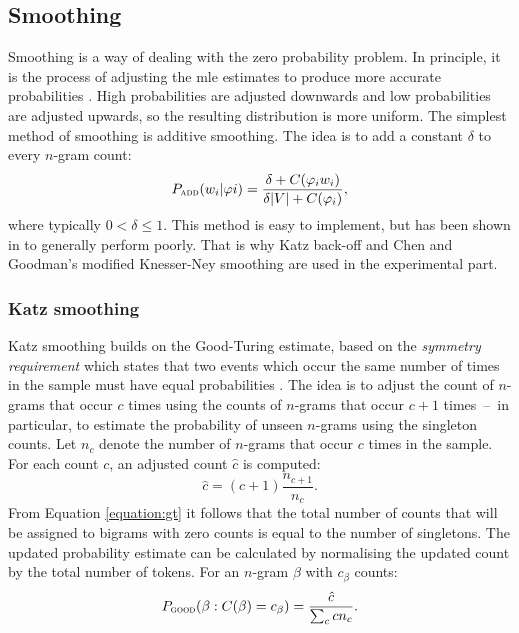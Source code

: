 	\subsection{Smoothing}
	\label{subsection:smoothing}
	Smoothing is a way of dealing with the zero probability problem. In principle, it is the process of adjusting the \gls{mle} estimates to produce more accurate probabilities \cite{chen1996empirical}. High probabilities are adjusted downwards and low probabilities are adjusted upwards, so the resulting distribution is more uniform. The simplest method of smoothing is additive smoothing. The idea is to add a constant $\delta$ to every \mbox{$n$-gram} count:
	\begin{equation}
		P_{\textsc{add}}(w_{i}|\varphi{i})=\frac{\delta+C(\varphi_{i}w_{i})}{\delta|V|+C(\varphi_{i})},
	\end{equation}
where typically $0 < \delta \leq 1$. This method is easy to implement, but has been shown in \cite{Gale94what'swrong} to generally perform poorly. That is why Katz back-off and Chen and Goodman's modified Knesser-Ney smoothing are used in the experimental part.
	\subsubsection*{Katz smoothing}
	Katz smoothing builds on the \mbox{Good-Turing} estimate, based on the \textit{symmetry requirement} which states that two events which occur the same number of times in the sample must have equal probabilities \cite{whittaker2000statistical}. The idea is to adjust the count of \mbox{$n$-gram}s that occur $c$ times using the counts of \mbox{$n$-gram}s that occur $c+1$ times~--~in particular, to estimate the probability of unseen \mbox{$n$-gram}s using the singleton counts. Let $n_{c}$ denote the number of \mbox{$n$-gram}s that occur $c$ times in the sample. For each count $c$, an adjusted count $\hat{c}$ is computed:
	\begin{equation}
		\hat{c}=(c+1)\frac{n_{c+1}}{n_{c}}.
		\label{equation:gt}
	\end{equation}
	From Equation \ref{equation:gt} it follows that the total number of counts that will be assigned to bigrams with zero counts is equal to the number of singletons. The updated probability estimate can be calculated by normalising the updated count by the total number of tokens. For an \mbox{$n$-gram} $\beta$ with $c_{\beta}$ counts:
	\begin{equation}
		P_{\textsc{good}}(\beta:C(\beta)=c_{\beta})=\frac{\hat{c}}{\sum_{c}cn_{c}}.
	\end{equation}

